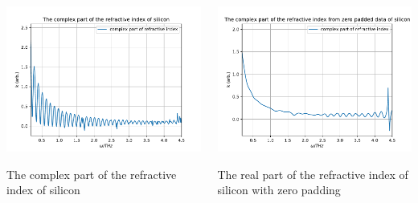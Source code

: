 \documentclass[aspectratio=1610, 9pt]{beamer}
\begin{document}
\begin{frame}
  \begin{center}
    \begin{columns}
      \begin{column}
        \includegraphics[width=\textwidth]{silicon/THz_complex_index.pdf}
        \caption{The complex part of the refractive index of silicon}
      \end{column}
      \begin{column}
        \includegraphics[width=\textwidth]{silicon/THz_complex_index_zero.pdf}
        \caption{The real part of the refractive index of silicon with zero padding}
      \end{column}
    \end{columns}
  \end{center}
\end{frame}
\end{document}

